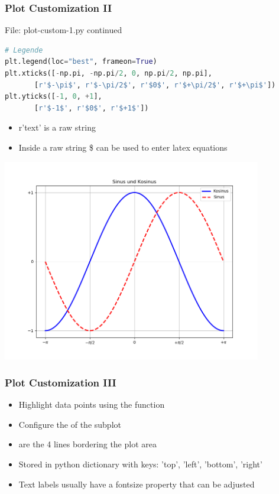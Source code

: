\begin{frame}[fragile]
	\frametitle{Plot Customization II}
    \begin{block}{File:  plot-custom-1.py continued}
    \begin{lstlisting}[language=Python]
# Legende
plt.legend(loc="best", frameon=True)
plt.xticks([-np.pi, -np.pi/2, 0, np.pi/2, np.pi],
       [r'$-\pi$', r'$-\pi/2$', r'$0$', r'$+\pi/2$', r'$+\pi$'])
plt.yticks([-1, 0, +1],
       [r'$-1$', r'$0$', r'$+1$'])
    \end{lstlisting}      
		\end{block}
    \begin{itemize}
      \item r'text' is a raw string
      \item Inside a raw string \$ can be used to enter latex equations
    \end{itemize}					
\end{frame}

\begin{frame}[fragile]
   \vspace{-1cm}
    \begin{center}
      \includegraphics[width=0.85\textwidth]{screenshots/plt-5.png}
    \end{center}						
\end{frame}

\begin{frame}[fragile]
	\frametitle{Plot Customization III}
    \begin{itemize}
      \item Highlight data points using the  function
      \item Configure the  of the subplot
      \item {} are the 4 lines bordering the plot area 
      \item Stored in python dictionary with keys: 'top', 'left', 'bottom', 'right'
      \item Text labels usually have a fontsize	property that can be adjusted		
    \end{itemize}					
\end{frame}

